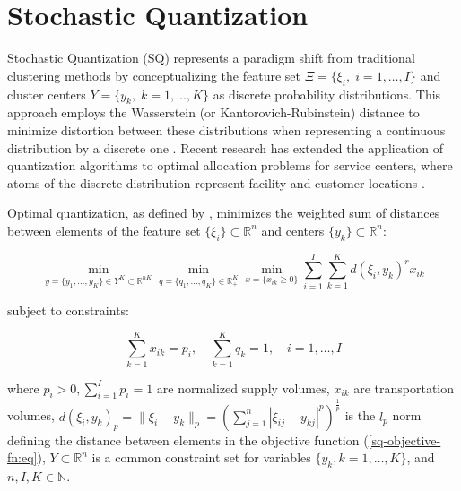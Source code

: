 \section{Stochastic Quantization}

Stochastic Quantization (SQ) represents a paradigm shift from traditional clustering methods by conceptualizing the feature set $\Xi = \{\xi_i, \;i = 1, \ldots, I\}$ and cluster centers $Y = \{y_k, \;k = 1, \ldots, K\}$ as discrete probability distributions. This approach employs the Wasserstein (or Kantorovich-Rubinstein) distance to minimize distortion between these distributions when representing a continuous distribution by a discrete one \cite{Kuzmenko_Uryasev_2019,Lakshmanan_Pichler_2023}. Recent research has extended the application of quantization algorithms to optimal allocation problems for service centers, where atoms of the discrete distribution represent facility and customer locations \cite{Kuzmenko_Uryasev_2019,Norkin_Onishchenko_2005}.

\begin{definition}
    \label{Stochastic Quantization}
    Optimal quantization, as defined by \cite{Kuzmenko_Uryasev_2019}, minimizes the weighted sum of distances between elements of the feature set $\{\xi_i\} \subset \mathbb{R}^{n}$ and centers $\{y_k\} \subset \mathbb{R}^{n}$:

    \begin{equation}
        \label{sq-objective-fn:eq}
        \min_{y = \{ y_1, \ldots, y_K \} \in Y^K \subset \mathbb{R}^{nK}} \min_{q = \{ q_1, \ldots, q_K \} \in \mathbb{R}^K_{+}} \min_{x = \{ x_{ik} \geq 0 \}} \sum_{i=1}^I \sum_{k=1}^K d(\xi_i, y_k)^r x_{ik}
    \end{equation}

    subject to constraints:

    \begin{equation}
        \label{sq-objective-constraints:eq}
        \sum_{k=1}^K x_{ik} = p_i, \quad \sum_{k=1}^K q_k = 1, \quad i = 1, \ldots, I
    \end{equation}

    \noindent where $p_i > 0, \sum_{i=1}^I p_i = 1$ are normalized supply volumes, $x_{ik}$ are transportation volumes, $d(\xi_i, y_k)_p = \| \xi_i - y_k \|_p = (\sum_{j=1}^n | \xi_{ij} - y_{kj} |^p)^{\frac{1}{p}}$ is the $l_p$ norm defining the distance between elements in the objective function (\ref{sq-objective-fn:eq}), $Y \subset \mathbb{R}^{n}$ is a common constraint set for variables $\{y_k, k = 1, \ldots, K\}$, and $n, I, K \in \mathbb{N}$.
\end{definition}

